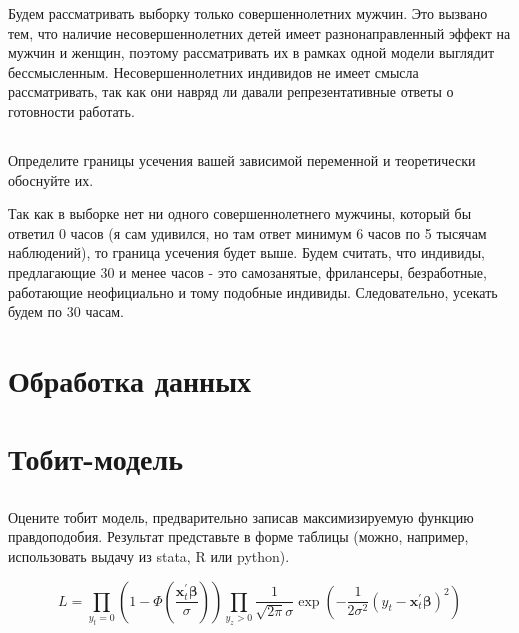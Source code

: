\documentclass[a4paper,12pt]{article}
\begin{document}
Будем рассматривать выборку только совершеннолетних мужчин. Это вызвано тем, что наличие несовершеннолетних детей имеет разнонаправленный эффект на мужчин и женщин, поэтому рассматривать их в рамках одной модели выглядит бессмысленным. Несовершеннолетних индивидов не имеет смысла рассматривать, так как они навряд ли давали репрезентативные ответы о готовности работать. 

\subsection{}

\Sun  Определите границы усечения вашей зависимой переменной и теоретически
обоснуйте их.


Так как в выборке нет ни одного совершеннолетнего мужчины, который бы ответил 0 часов (я сам удивился, но там ответ минимум 6 часов по 5 тысячам наблюдений), то граница усечения будет выше. Будем считать, что индивиды, предлагающие 30 и менее часов - это самозанятые, фрилансеры, безработные, работающие неофициально и тому подобные индивиды. Следовательно, усекать будем по 30 часам.

\section{Обработка данных}

\section{Тобит-модель}

\subsection{}

\Sun Оцените тобит модель, предварительно записав максимизируемую функцию
правдоподобия. Результат представьте в форме таблицы (можно, например, использовать
выдачу из stata, R или python).




\[ L=\prod_{y_{t}=0}\left(1-\Phi\left(\frac{\boldsymbol{x}_{t}^{\prime} \boldsymbol{\beta}}{\sigma}\right)\right) \prod_{y_{z}>0} \frac{1}{\sqrt{2 \pi} \sigma} \exp \left(-\frac{1}{2 \sigma^{2}}\left(y_{t}-\boldsymbol{x}_{t}^{\prime} \boldsymbol{\beta}\right)^{2}\right) \]
\end{document}
